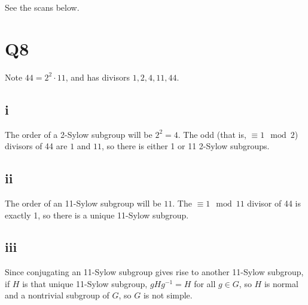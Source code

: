 \documentclass[12pt,letterpaper]{article}
\theoremstyle{definition}
\begin{document}
See the scans below.

\section*{Q8}

Note $44 = 2^{2} \cdot 11$, and has divisors $1,2,4,11,44$.

\subsection*{i}

The order of a 2-Sylow subgroup will be $2^{2} = 4$. The odd (that is, $\equiv 1 \mod 2$) divisors of 44 are $1$ and $11$, so there is either 1 or 11 2-Sylow subgroups.

\subsection*{ii}

The order of an 11-Sylow subgroup will be $11$. The $\equiv 1 \mod 11$ divisor of 44 is exactly 1, so there is a unique 11-Sylow subgroup.

\subsection*{iii}

Since conjugating an 11-Sylow subgroup gives rise to another 11-Sylow subgroup, if $H$ is that unique 11-Sylow subgroup, $gHg^{-1} = H$ for all $g \in G$, so $H$ is normal and a nontrivial subgroup of $G$, so $G$ is not simple.
\end{document}
